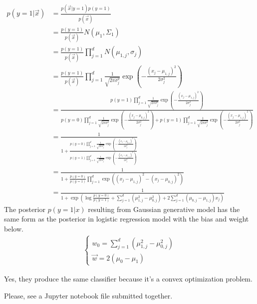 \documentclass{introtosml}
\newcommand{\x}{\vec{x}}
\newcommand{\w}{\vec{w}}
\newcommand\expp[1]{\exp\left(#1\right)}
\newcommand\gauss[1]{\prod_{j=1}^d \frac{1}{\sqrt{2 \pi \sigma_j^2}} \expp{- \frac{(x_j - \mu_{#1,j})^2}{2 \sigma_j^2}}}
\newcommand\cgauss[1]{p(y=#1)\gauss{#1}}
\newcommand\pbias{\frac{p(y=0)}{p(y=1)}}
\begin{document}
\maketitle

\begin{p}
  \item
    \begin{align*}
      p(y=1|\x)
      & = \frac{p(\x|y=1)p(y=1)}{p(\x)} \\
      & = \frac{p(y=1)}{p(\x)} N(\mu_1, \Sigma_1) \\
      & = \frac{p(y=1)}{p(\x)} \prod_{j=1}^d N(\mu_{1,j}, \sigma_j) \\
      & = \frac{p(y=1)}{p(\x)} \gauss{1} \\
      & = \frac{\cgauss{1}}{\cgauss{0} + \cgauss{1}} \\
      & = \frac{1}{1 + \frac{\cgauss{0}}{\cgauss{1}}} \\
      & = \frac{1}{1 + \pbias \prod_{j=1}^d \expp{(x_j - \mu_{1,j})^2 - (x_j - \mu_{0,j})^2}} \\
      & = \frac{1}{1 +
          \expp{\log \pbias + \sum_{j=1}^d (\mu_{1,j}^2 - \mu_{0,j}^2)
          + 2 \sum_{j=1}^d (\mu_{0,j} - \mu_{1,j}) x_j}}
    \end{align*}
    \therefore The posterior $p(y=1|x)$ resulting from Gaussian generative
    model has the same form as the posterior in logistic regression model
    with the bias and weight below.
    \begin{gather*}
      \begin{cases}
        w_0 = \sum_{j=1}^d (\mu_{1,j}^2 - \mu_{0,j}^2) \\
        \w = 2 (\mu_0 - \mu_1)
      \end{cases}
    \end{gather*}

  \item
    Yes, they produce the same classifier because it's a convex optimization problem.

  \item
    Please, see a Jupyter notebook file submitted together.
\end{p}

\end{document}
